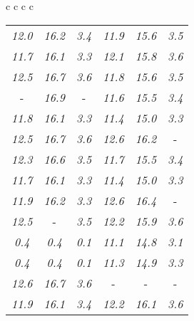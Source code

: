 \documentclass[sigplan,screen]{acmart}
\makeatletter
\newcommand{\ccell}[3][]{%
  \kern-\fboxsep
  \if\relax\detokenize{#1}\relax
    \expandafter\@firstoftwo
  \else
    \expandafter\@secondoftwo
  \fi
  {\colorbox{#2}}%
  {\colorbox[#1]{#2}}%
  {#3}\kern-\fboxsep
}
\makeatother
\begin{document}
\begin{table*}
\begin{tabular}{c c c c}
\begin{tabular}{c c c c c c}
      \textit{12.0} & \textit{16.2} & \textit{3.4} & \textit{11.9} & \textit{15.6} & \textit{3.5} \\
      \textit{11.7} & \textit{16.1} & \textit{3.3} & \textit{12.1} & \textit{15.8} & \textit{3.6} \\
      \textit{12.5} & \textit{16.7} & \textit{3.6} & \textit{11.8} & \textit{15.6} & \textit{3.5} \\
       \ccell[gray]{0.9}{\textit{12.7}} & \textit{16.9} &  \ccell[gray]{0.9}{\textit{3.7}} & \textit{11.6} & \textit{15.5} & \textit{3.4} \\
      \textit{11.8} & \textit{16.1} & \textit{3.3} & \textit{11.4} & \textit{15.0} & \textit{3.3} \\
      \textit{12.5} & \textit{16.7} & \textit{3.6} & \textit{12.6} & \textit{16.2} &  \ccell[gray]{0.9}{\textit{3.8}} \\
      \textit{12.3} & \textit{16.6} & \textit{3.5} & \textit{11.7} & \textit{15.5} & \textit{3.4} \\
      \textit{11.7} & \textit{16.1} & \textit{3.3} & \textit{11.4} & \textit{15.0} & \textit{3.3} \\
      \textit{11.9} & \textit{16.2} & \textit{3.3} & \textit{12.6} & \textit{16.4} &  \ccell[gray]{0.9}{\textit{3.8}} \\
      \textit{12.5} &  \ccell[gray]{0.9}{\textit{17.1}} & \textit{3.5} & \textit{12.2} & \textit{15.9} & \textit{3.6} \\
      \textit{0.4} & \textit{0.4} & \textit{0.1} & \textit{11.1} & \textit{14.8} & \textit{3.1} \\
      \textit{0.4} & \textit{0.4} & \textit{0.1} & \textit{11.3} & \textit{14.9} & \textit{3.3} \\
      \textit{12.6} & \textit{16.7} & \textit{3.6} &  \ccell[gray]{0.9}{\textit{12.7}} &  \ccell[gray]{0.9}{\textit{16.6}} &  \ccell[gray]{0.9}{\textit{3.8}} \\
      \textit{11.9} & \textit{16.1} & \textit{3.4} & \textit{12.2} & \textit{16.1} & \textit{3.6} \\
\end{tabular}
\\


       
    \end{tabular} \\
    
\bigskip
\end{table*} \\
\end{document}

